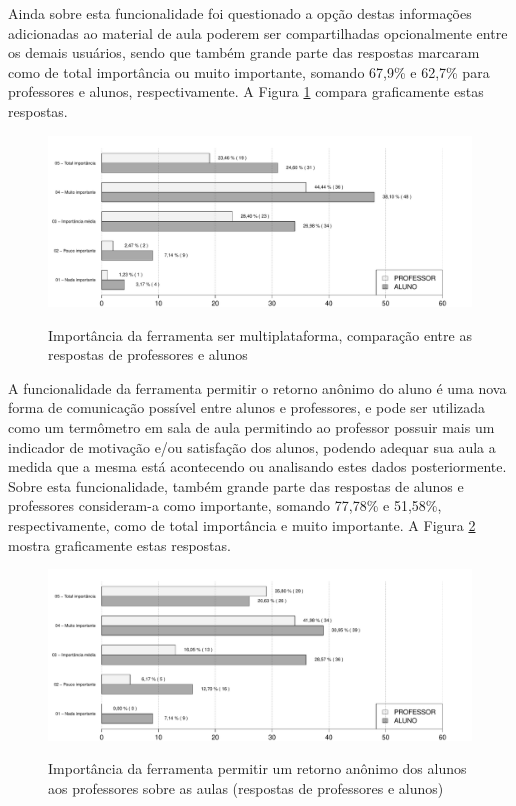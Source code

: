 Ainda sobre esta funcionalidade foi questionado a opção destas informações adicionadas ao material de aula poderem ser compartilhadas opcionalmente entre os demais usuários, sendo que também grande parte das respostas marcaram como de total importância ou muito importante, somando 67,9\% e 62,7\% para professores e alunos, respectivamente. A Figura \ref{fig:grafico_compartilhar_anotacoes} compara graficamente estas respostas.


\begin{figure}[!h]
\centering
\caption{Importância da ferramenta ser multiplataforma, comparação entre as respostas de professores e alunos}
\includegraphics[width=1.0\textwidth]{pdfs/alunos-professores/funcionalidades-compar-anotacoes.pdf} 
\label{fig:grafico_compartilhar_anotacoes} 
\end{figure}

A funcionalidade da ferramenta permitir o retorno anônimo do aluno é uma nova forma de comunicação possível entre alunos e professores, e pode ser utilizada como um termômetro em sala de aula permitindo ao professor possuir mais um indicador de motivação e/ou satisfação dos alunos, podendo adequar sua aula a medida que a mesma está acontecendo ou analisando estes dados posteriormente. Sobre esta funcionalidade, também grande parte das respostas de alunos e professores consideram-a como importante, somando 77,78\% e 51,58\%, respectivamente, como de total importância e muito importante. A Figura \ref{fig:grafico_retorno} mostra graficamente estas respostas.

\begin{figure}[!h]
\centering
\caption{Importância da ferramenta permitir um retorno anônimo dos alunos aos professores sobre as aulas (respostas de professores e alunos)}
\includegraphics[width=1.0\textwidth]{pdfs/alunos-professores/funcionalidades-retorno.pdf} 
\label{fig:grafico_retorno} 
\end{figure}


